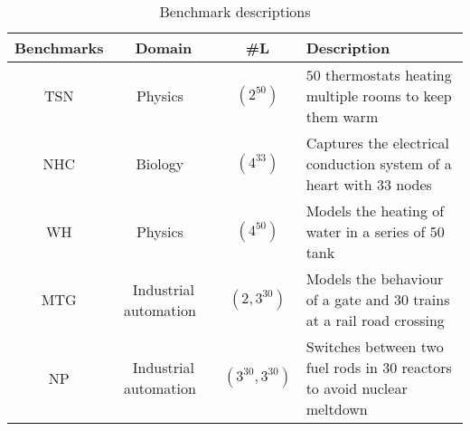 \begin{table*}
	\centering
	\caption{Benchmark descriptions
	\label{tab:benchmarks}}
\begin{tabular}{ | c | c | c | l | } \hline
\textbf{Benchmarks}
	& \textbf{Domain} 
	& \textbf{\#L } 
	& \textbf{Description} \\ \hline

	\acf{TSN}
		& Physics~\cite{Pedro2005}
		& $(2^{50})$
		& $50$ thermostats heating multiple rooms to keep them warm\\ \hline
		
	\acf{NHC}
		& Biology~\cite{chen201487}
		& $(4^{33})$
		& Captures the electrical conduction system of a heart with $33$ nodes\\ \hline

	\acf{WH}
		& Physics~\cite{raskin05}
		& $(4^{50})$
		& Models the heating of water in a series of $50$ tank\\ \hline
		
	\acf{MTG}  
		& Industrial automation~\cite{Costello2013}
		& $(2, 3^{30})$
		& Models the behaviour of a gate and $30$ trains at a rail road crossing\\ \hline
		
	\acf{NP}
		& Industrial automation~\cite{alur2015book}
		& $(3^{30}, 3^{30})$
		& Switches between two fuel rods in $30$ reactors to avoid nuclear meltdown\\ \hline
	
	
 \end{tabular}
 \end{table*}
